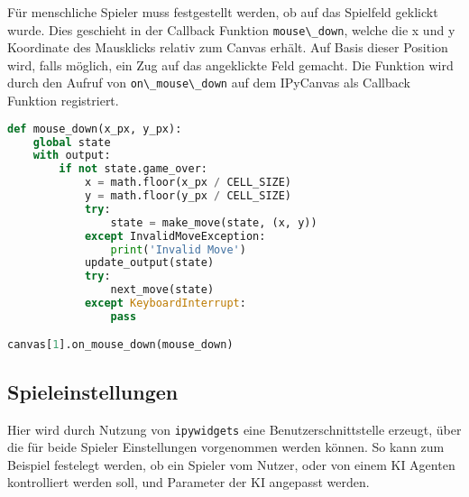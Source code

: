 Für menschliche Spieler muss festgestellt werden, ob auf das Spielfeld
geklickt wurde. Dies geschieht in der Callback Funktion
\passthrough{\lstinline!mouse\_down!}, welche die x und y Koordinate des
Mausklicks relativ zum Canvas erhält. Auf Basis dieser Position wird,
falls möglich, ein Zug auf das angeklickte Feld gemacht. Die Funktion
wird durch den Aufruf von \passthrough{\lstinline!on\_mouse\_down!} auf
dem IPyCanvas als Callback Funktion registriert.

\begin{lstlisting}[language=Python]
def mouse_down(x_px, y_px):
    global state
    with output:
        if not state.game_over:
            x = math.floor(x_px / CELL_SIZE)
            y = math.floor(y_px / CELL_SIZE)
            try:
                state = make_move(state, (x, y))
            except InvalidMoveException:
                print('Invalid Move')
            update_output(state)
            try:
                next_move(state)
            except KeyboardInterrupt:
                pass

canvas[1].on_mouse_down(mouse_down)
\end{lstlisting}

\hypertarget{spieleinstellungen}{%
\subsection{Spieleinstellungen}\label{spieleinstellungen}}

Hier wird durch Nutzung von \passthrough{\lstinline!ipywidgets!} eine
Benutzerschnittstelle erzeugt, über die für beide Spieler Einstellungen
vorgenommen werden können. So kann zum Beispiel festelegt werden, ob ein
Spieler vom Nutzer, oder von einem KI Agenten kontrolliert werden soll,
und Parameter der KI angepasst werden.

